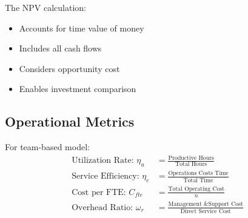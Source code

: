 \documentclass[12pt,a4paper]{article}
\newenvironment{definition}[1]
{\begin{mdframed}[style=definitionstyle,frametitle={Definition: #1}]}
{\end{mdframed}}
\newenvironment{explanation}
{\begin{mdframed}[style=explanationstyle,frametitle={Explanation}]}
{\end{mdframed}}
\begin{document}
\begin{explanation}
The NPV calculation:
\begin{itemize}
    \item Accounts for time value of money
    \item Includes all cash flows
    \item Considers opportunity cost
    \item Enables investment comparison
\end{itemize}
\end{explanation}

\subsection{Operational Metrics}
\begin{definition}{Team Efficiency Metrics}
For team-based model:
\begin{align*}
    \text{Utilization Rate: } \eta_u &= \frac{\text{Productive Hours}}{\text{Total Hours}} \\[1em]
    \text{Service Efficiency: } \eta_e &= \frac{\text{Operations Costs Time}}{\text{Total Time}} \\[1em]
    \text{Cost per FTE: } C_{fte} &= \frac{\text{Total Operating Cost}}{n} \\[1em]
    \text{Overhead Ratio: } \omega_r &= \frac{\text{Management \& Support Cost}}{\text{Direct Service Cost}}
\end{align*}
\end{definition}
\end{document}
